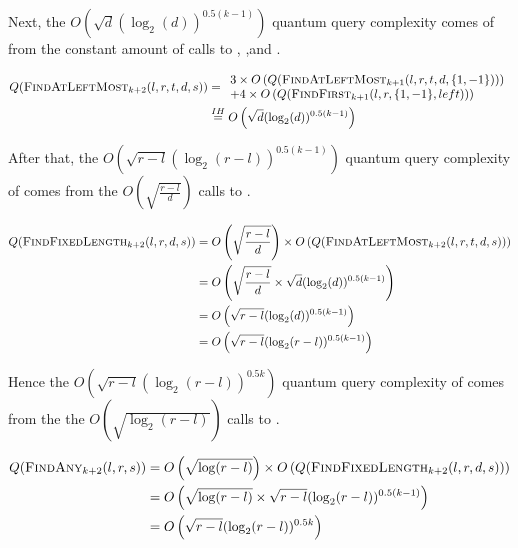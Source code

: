 \begin{appendix}
\begin{tproof}
{            Next, the $ O\left(\sqrt{d}(\log_2(d))^{0.5(k-1)} \right)$ quantum query complexity comes of from the constant amount
            of calls to ,  ,and .

            \begin{align*}
                Q(\textrm{\textsc{FindAtLeftMost$_{k+2}$}}(l,r,t,d,s)) & = \begin{array}{l}
                    3 \times O\left(Q(\textrm{\textsc{FindAtLeftMost$_{k+1}$}}(l,r,t,d,\{1,-1\}))\right) \\
                    + 4 \times O\left(Q(\textrm{\textsc{FindFirst$_{k+1}$}}(l,r,\{1,-1\},left))\right)
                \end{array}                                  \\
                                                  & \overset{IH}{=} O\left(\sqrt{d}(\log_2(d))^{0.5(k-1)} \right)
            \end{align*}

            After that, the $O\left( \sqrt{r-l}(\log_2(r-l))^{0.5(k-1)}\right)$ quantum query complexity of  comes from the
            $O\left(\sqrt{\frac{r-l}{d}}\right)$ calls to .

            \begin{align*}
                Q(\textrm{\textsc{FindFixedLength$_{k+2}$}}(l, r, d, s)) & = O\left(\sqrt{\frac{r-l}{d}}\right) \times O\left(Q(\textrm{\textsc{FindAtLeftMost$_{k+2}$}}(l,r,t,d,s))\right) \\
                                                  & = O\left( \sqrt{\frac{r-l}{d}} \times \sqrt{d}(\log_2(d))^{0.5(k-1)}\right)                 \\
                                                  & = O\left( \sqrt{r-l}(\log_2(d))^{0.5(k-1)}\right)                                           \\
                                                  & = O\left( \sqrt{r-l}(\log_2(r-l))^{0.5(k-1)}\right)
            \end{align*}

            Hence the $O\left( \sqrt{r-l}(\log_2(r-l))^{0.5k} \right)$ quantum query complexity of  comes from the
            the $O\left(\sqrt{\log_2(r-l)}\right)$ calls to .

            \begin{align*}
                Q(\textrm{\textsc{FindAny$_{k+2}$}}(l, r, s)) & = O\left(\sqrt{\log(r-l)}\right) \times O\left(Q(\textrm{\textsc{FindFixedLength$_{k+2}$}}(l, r, d, s))\right) \\
                                              & = O\left( \sqrt{\log(r-l)} \times \sqrt{r-l}(\log_2(r-l))^{0.5(k-1)} \right)            \\
                                              & = O\left( \sqrt{r-l}(\log_2(r-l))^{0.5k} \right)                                        \\
            \end{align*}

}
\end{tproof}
\end{appendix}
